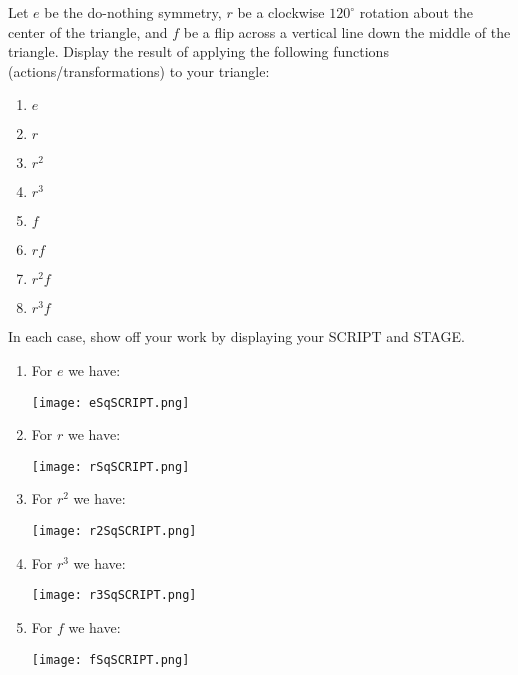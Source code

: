 \documentclass[noauthor,nooutcomes,12pt,hints,handout]{ximera}
\begin{document}
\begin{question}
  Let $e$ be the do-nothing symmetry, $r$ be a clockwise $120^\circ$
  rotation about the center of the triangle, and $f$ be a flip across
  a vertical line down the middle of the triangle. Display the result
  of applying the following functions (actions/transformations) to
  your triangle:
  \begin{enumerate}
  \item $e$
  \item $r$
  \item $r^2$
  \item $r^3$
  \item $f$
  \item $rf$
  \item $r^2 f$
  \item $r^3 f$
  \end{enumerate}
  In each case, show off your work by displaying your SCRIPT and
  STAGE.
  \begin{freeResponse}
    \begin{enumerate}
    \item For $e$ we have:
      \begin{center}
        \texttt{[image: eSqSCRIPT.png]}   \qquad {}
      \end{center}
    \item For $r$ we have:
      \begin{center}
        \texttt{[image: rSqSCRIPT.png]}   \qquad {}
      \end{center}
    \item For $r^2$ we have:
      \begin{center}
        \texttt{[image: r2SqSCRIPT.png]}   \qquad {}
      \end{center}
    \item For $r^3$ we have:
      \begin{center}
        \texttt{[image: r3SqSCRIPT.png]}   \qquad {}
      \end{center}
    \item For $f$ we have:
      \begin{center}
        \texttt{[image: fSqSCRIPT.png]}   \qquad {}
      \end{center}

\end{enumerate}
\end{freeResponse}
\end{question}
\end{document}
